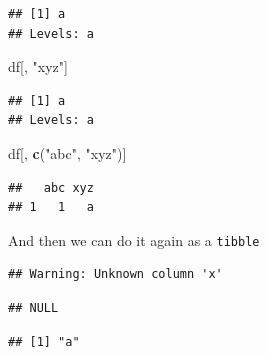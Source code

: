 \documentclass[]{book}
\newenvironment{Shaded}{\begin{snugshade}}{\end{snugshade}}
\newcommand{\KeywordTok}[1]{\textcolor[rgb]{0.13,0.29,0.53}{\textbf{{#1}}}}
\newcommand{\DataTypeTok}[1]{\textcolor[rgb]{0.13,0.29,0.53}{{#1}}}
\newcommand{\DecValTok}[1]{\textcolor[rgb]{0.00,0.00,0.81}{{#1}}}
\newcommand{\StringTok}[1]{\textcolor[rgb]{0.31,0.60,0.02}{{#1}}}
\newcommand{\NormalTok}[1]{{#1}}
\theoremstyle{definition}
\theoremstyle{definition}
\theoremstyle{remark}
\begin{document}
\begin{enumerate}
\begin{verbatim}
## [1] a
## Levels: a
\end{verbatim}

\begin{Shaded}
\begin{Highlighting}[]
\NormalTok{df[, }\StringTok{"xyz"}\NormalTok{]}
\end{Highlighting}
\end{Shaded}

\begin{verbatim}
## [1] a
## Levels: a
\end{verbatim}

\begin{Shaded}
\begin{Highlighting}[]
\NormalTok{df[, }\KeywordTok{c}\NormalTok{(}\StringTok{"abc"}\NormalTok{, }\StringTok{"xyz"}\NormalTok{)]}
\end{Highlighting}
\end{Shaded}

\begin{verbatim}
##   abc xyz
## 1   1   a
\end{verbatim}

  And then we can do it again as a \texttt{tibble}

\begin{Shaded}
\end{Shaded}

\begin{verbatim}
## Warning: Unknown column 'x'
\end{verbatim}

\begin{verbatim}
## NULL
\end{verbatim}

\begin{Shaded}
\end{Shaded}

\begin{verbatim}
## [1] "a"
\end{verbatim}


\end{enumerate}
\end{document}
